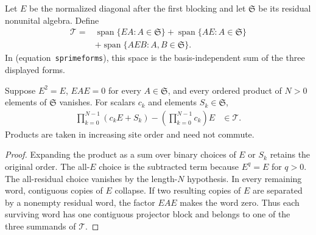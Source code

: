 \begin{definition}
    \label{def:mpu_three_form_subspace}
    \leanok
    Let $E$ be the normalized diagonal after the first blocking and let
    $\mathfrak S$ be its residual nonunital algebra.  Define
    \begin{align}
        \mathcal T={} & \operatorname{span}\{EA:A\in\mathfrak S\}
        +\operatorname{span}\{AE:A\in\mathfrak S\}                     \\
                      & +\operatorname{span}\{AEB:A,B\in\mathfrak S\}.
    \end{align}
    In \cite[Proposition~III.3(ii)]{Cirac2017MPU} (equation~\texttt{sprimeforms}), this space is the basis-independent sum of the three
    displayed
    forms.
\end{definition}

\begin{lemma}
    \label{thm:mpu_ordered_second_block_expansion}
    \leanok
    Suppose $E^2=E$, $EAE=0$ for every $A\in\mathfrak S$, and every ordered
    product of $N>0$ elements of $\mathfrak S$ vanishes.  For scalars $c_k$
    and elements $S_k\in\mathfrak S$,
    \begin{align}
        \prod_{k=0}^{N-1}(c_kE+S_k)
        -\left(\prod_{k=0}^{N-1}c_k\right)E & \in\mathcal T.
    \end{align}
    Products are taken in increasing site order and need not commute.
\end{lemma}

\begin{proof}\leanok
    Expanding the product as a sum over binary choices of $E$ or $S_k$ retains
    the original order.  The all-$E$ choice is the subtracted term because
    $E^q=E$ for $q>0$.  The all-residual choice vanishes by the length-$N$
    hypothesis.  In every remaining word, contiguous copies of $E$ collapse.
    If two resulting copies of $E$ are separated by a nonempty residual word,
    the factor $EAE$ makes the word zero.  Thus each surviving word has one
    contiguous projector block and belongs to one of the three summands of
    $\mathcal T$.
\end{proof}

